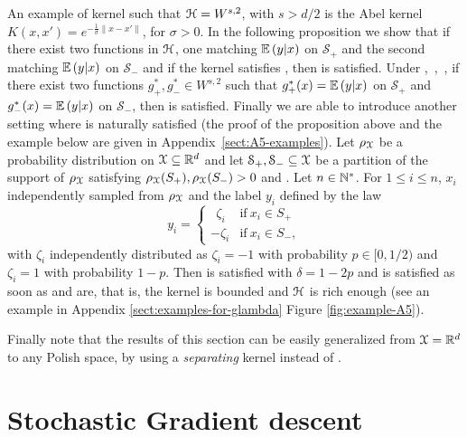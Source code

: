 \documentclass[final]{colt2018} %
\begin{document}
\eas
An example of kernel such that $\mathcal H = W^{s,2}$, with $s > d/2$ is the Abel kernel $K(x,x') = e^{-\frac{1}{\sigma}\|x-x'\|}$, for $\sigma > 0$.
In the following proposition we show that if there exist two functions in $\mathcal H$, one matching $\mathbb{E}\left({y}\middle|{x}\right)$ on $\mathcal{S}_+$ and the second matching $\mathbb{E}\left({y}\middle|{x}\right)$ on $\mathcal{S}_-$ and if the kernel satisfies , then  is satisfied. 
%
\bp\label{prop:2g-makes-gstar}
Under ,~,~, if there exist two functions $g_+^*, g_-^* \in W^{s,2}$ such that $g_+^*(x) = \mathbb{E}\left({y}\middle|{x}\right)$ on $\mathcal{S}_+$ and $g_-^*(x) = \mathbb{E}\left({y}\middle|{x}\right)$ on $\mathcal{S}_-$, then  is satisfied.
\ep
%
Finally we are able to introduce another setting where  is naturally satisfied (the proof of the proposition above and the example below are given in Appendix~\ref{sect:A5-examples}).
%
\label{ex:independent-noise-on-labels}
Let ${\rho_{{\mathcal X}}}$ be a probability distribution on ${\mathcal X} \subseteq \mathbb R^d$ and let $\mathcal{S}_+, \mathcal{S}_- \subseteq {\mathcal X}$ be a partition of the support of $\rho_{\mathcal X}$ satisfying ${\rho_{{\mathcal X}}}(S_+), {\rho_{{\mathcal X}}}(S_-) > 0$ and . Let $n \in \mathbb N^*$. For $1 \leq i \leq n$,  $x_i$ independently sampled from ${\rho_{{\mathcal X}}}$ and the label $y_i$ defined by the law 
$$y_i = \begin{cases}
\ \ \zeta_i & \textrm{if} ~ x_i \in S_+\\
-\zeta_i & \textrm{if} ~ x_i \in S_-,
\end{cases}$$ 
with $\zeta_i$ independently distributed as $\zeta_i = -1$ with probability $p \in [0,1/2)$ and $\zeta_i = 1$ with probability $1-p$. Then  is satisfied with $\delta = 1-2p$ and  is satisfied as soon as  and  are, that is, the kernel is bounded and ${\mathcal H}$ is rich enough (see an example in Appendix \ref{sect:examples-for-glambda} Figure \ref{fig:example-A5}).
\eex

Finally note that the results of this section can be easily generalized from ${\mathcal X} = \mathbb R^d$ to any Polish space, by using a {\em separating} kernel \citep{de2014learning,rudi2014learning} instead of .

\section{Stochastic Gradient descent}
\label{sec:sgd}
\end{document}
